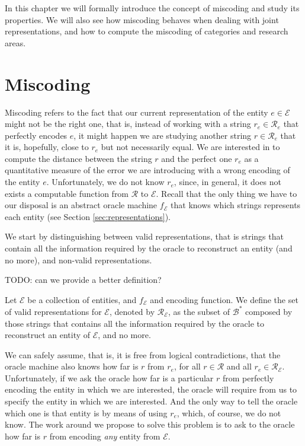 In this chapter we will formally introduce the concept of miscoding and study its properties. We will also see how miscoding behaves when dealing with joint representations, and how to compute the miscoding of categories and research areas.

%
%
\section{Miscoding}
\label{sec:miscoding}

Miscoding refers to the fact that our current representation of the entity $e \in \mathcal{E}$ might not be the right one, that is, instead of working with a string $r_e \in \mathcal{R}_e$ that perfectly encodes $e$, it might happen we are studying another string $r \in \mathcal{R}_e$ that it is, hopefully, close to $r_e$ but not necessarily equal. We are interested in to compute the distance between the string $r$ and the perfect one $r_e$ as a quantitative measure of the error we are introducing with a wrong encoding of the entity $e$. Unfortunately, we do not know $r_e$, since, in general, it does not exists a computable function from $\mathcal{R}$ to $\mathcal{E}$. Recall that the only thing we have to our disposal is an abstract oracle machine $f_\mathcal{E}$ that knows which strings represents each entity (see Section \ref{sec:representations}).

We start by distinguishing between valid representations, that is strings that contain all the information required by the oracle to reconstruct an entity (and no more), and non-valid representations.

{\color{red} TODO: can we provide a better definition?}

\begin{definition}
Let $\mathcal{E}$ be a collection of entities, and $f_\mathcal{E}$ and encoding function. We define the set of valid representations for $\mathcal{E}$, denoted by $\mathcal{R}_\mathcal{E}$, as the subset of $\mathcal{B}^\ast$ composed by those strings that contains all the information required by the oracle to reconstruct an entity of $\mathcal{E}$, and no more.
\end{definition}

We can safely assume, that is, it is free from logical contradictions, that the oracle machine also knows how far is $r$ from $r_e$, for all $r \in \mathcal{R}$ and all $r_e \in \mathcal{R}_\mathcal{E}$. Unfortunately, if we ask the oracle how far is a particular $r$ from perfectly encoding the entity in which we are interested, the oracle will require from us to specify the entity in which we are interested. And the only way to tell the oracle which one is that entity is by means of using $r_e$, which, of course, we do not know. The work around we propose to solve this problem is to ask to the oracle how far is $r$ from encoding \emph{any} entity from $\mathcal{E}$.

